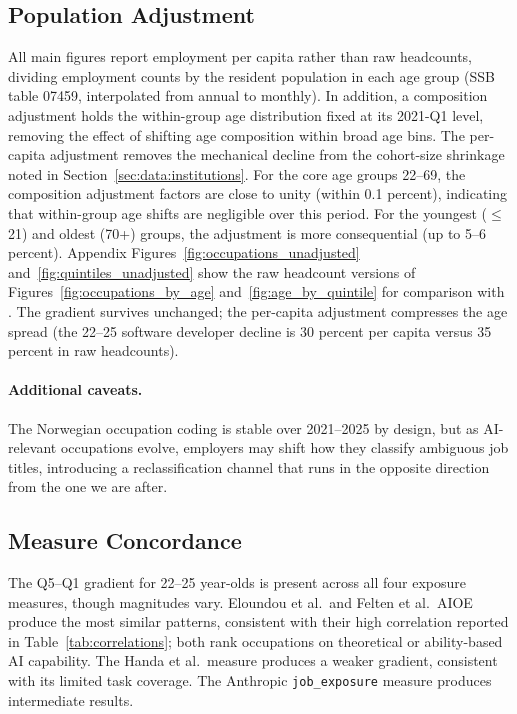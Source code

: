 \subsection{Population Adjustment}\label{sec:robustness:adjustment}

All main figures report employment per capita rather than raw headcounts, dividing employment counts by the resident population in each age group (SSB table 07459, interpolated from annual to monthly). In addition, a composition adjustment holds the within-group age distribution fixed at its 2021-Q1 level, removing the effect of shifting age composition within broad age bins. The per-capita adjustment removes the mechanical decline from the cohort-size shrinkage noted in Section~\ref{sec:data:institutions}. For the core age groups 22--69, the composition adjustment factors are close to unity (within 0.1 percent), indicating that within-group age shifts are negligible over this period. For the youngest ($\leq$21) and oldest (70+) groups, the adjustment is more consequential (up to 5--6 percent). Appendix Figures~\ref{fig:occupations_unadjusted} and~\ref{fig:quintiles_unadjusted} show the raw headcount versions of Figures~\ref{fig:occupations_by_age} and~\ref{fig:age_by_quintile} for comparison with \citet{brynjolfsson2025}. The gradient survives unchanged; the per-capita adjustment compresses the age spread (the 22--25 software developer decline is 30 percent per capita versus 35 percent in raw headcounts).

\paragraph{Additional caveats.} The Norwegian occupation coding is stable over 2021--2025 by design, but as AI-relevant occupations evolve, employers may shift how they classify ambiguous job titles, introducing a reclassification channel that runs in the opposite direction from the one we are after. 


\subsection{Measure Concordance}\label{sec:robustness:concordance}

The Q5--Q1 gradient for 22--25 year-olds is present across all four exposure measures, though magnitudes vary. Eloundou et al.\ and Felten et al.\ AIOE produce the most similar patterns, consistent with their high correlation reported in Table~\ref{tab:correlations}; both rank occupations on theoretical or ability-based AI capability. The Handa et al.\ measure produces a weaker gradient, consistent with its limited task coverage. The Anthropic \texttt{job\_exposure} measure produces intermediate results.

